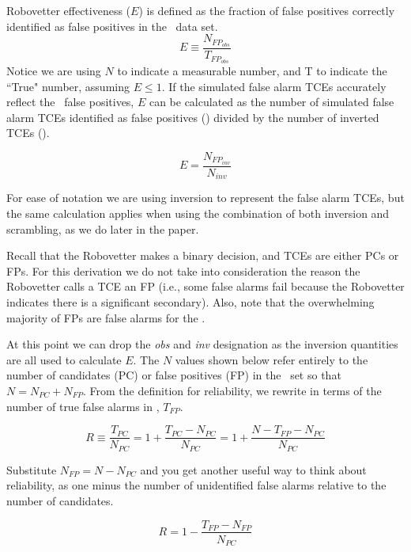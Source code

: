 Robovetter effectiveness ($E$) is defined as the fraction of false positives correctly identified as false positives in the \opstce\ data set. 
\begin{equation}
\label{effect1}
E \equiv \frac{N_{FP_{obs}}}{T_{FP_{obs}}}
\end{equation}
Notice we are using $N$ to indicate a measurable number, and T to indicate the ``True" number, assuming $E\leq 1 $.  If the simulated false alarm TCEs accurately reflect the \opstce\ false positives, $E$ can be calculated as the number of simulated false alarm TCEs identified as false positives (\invfp) divided by the number of inverted TCEs (\invN). 

\begin{equation}
\label{effect2}
E = \frac{N_{FP_{inv}}}{N_{inv}}
\end{equation}

For ease of notation we are using inversion to represent the false alarm TCEs, but the same calculation applies when using the combination of both inversion and scrambling, as we do later in the paper.

Recall that the Robovetter makes a binary decision, and TCEs are either PCs or FPs. For this derivation we do not take into consideration the reason the Robovetter calls a TCE an FP (i.e., some false alarms fail because the Robovetter indicates there is a significant secondary). Also, note that the overwhelming majority of FPs are false alarms for the .

At this point we can drop the \textit{obs} and \textit{inv} designation as the inversion quantities are all used to calculate $E$. The $N$ values shown below refer entirely to the number of candidates (PC) or false positives (FP) in the \opstce\ set so that $N=N_{PC} + N_{FP}$. From the definition for reliability, we rewrite in terms of the number of true false alarms in \opstce, $T_{FP}$.

\begin{equation}
R \equiv \frac{T_{PC}}{N_{PC}} =  1 + \frac{T_{PC}-N_{PC}}{N_{PC}} 
= 1 + \frac{N - T_{FP} - N_{PC}}{N_{PC}}
\end{equation}

Substitute $N_{FP}=N-N_{PC}$ and you get another useful way to think about reliability, as one minus the number of unidentified false alarms relative to the number of candidates.

\begin{equation}
\label{eq:rel2}
R = 1 - \frac{T_{FP}-N_{FP}}{N_{PC}}
\end{equation}

